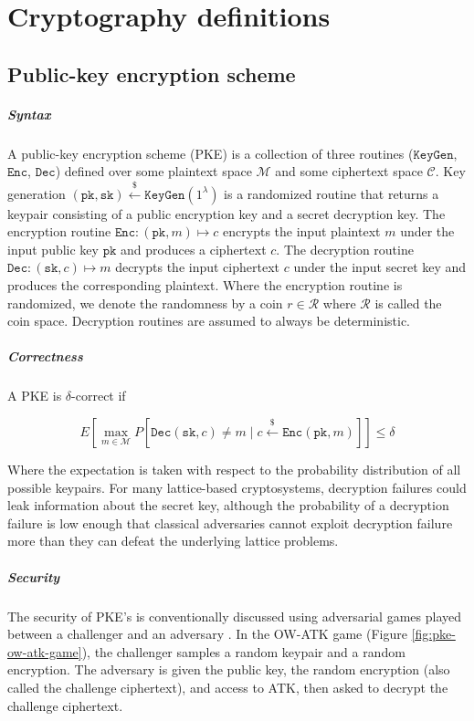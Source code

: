 \documentclass[letterpaper,12pt,titlepage,oneside,final]{book}
\newcommand{\keygen}{\texttt{KeyGen}}
\newcommand{\encrypt}{\texttt{Enc}}
\newcommand{\decrypt}{\texttt{Dec}}
\newcommand{\pk}{\texttt{pk}}
\newcommand{\sk}{\texttt{sk}}
\newcommand{\leftsample}{\stackrel{\$}{\leftarrow}}
\begin{document}
\chapter{Cryptography definitions}\label{sec:cryptography-definitions}
\section{Public-key encryption scheme}
\paragraph{Syntax} A public-key encryption scheme (PKE) is a collection of three routines ($\keygen$, $\encrypt$, $\decrypt$) defined over some plaintext space $\mathcal{M}$ and some ciphertext space $\mathcal{C}$. Key generation $(\pk, \sk) \leftsample \keygen(1^\lambda)$ is a randomized routine that returns a keypair consisting of a public encryption key and a secret decryption key. The encryption routine $\encrypt: (\pk, m) \mapsto c$ encrypts the input plaintext $m$ under the input public key $\pk$ and produces a ciphertext $c$. The decryption routine $\decrypt: (\sk, c) \mapsto m$ decrypts the input ciphertext $c$ under the input secret key and produces the corresponding plaintext. Where the encryption routine is randomized, we denote the randomness by a coin $r \in \mathcal{R}$ where $\mathcal{R}$ is called the coin space. Decryption routines are assumed to always be deterministic.

\paragraph{Correctness} A PKE is $\delta$-correct if

\begin{equation*}
    E\left[\max_{m\in\mathcal{M}}
        P\left[ \decrypt(\sk, c) \neq m \mid c \leftsample \encrypt(\pk, m)\right]
    \right] \leq \delta
\end{equation*}

Where the expectation is taken with respect to the probability distribution of all possible keypairs. For many lattice-based cryptosystems, decryption failures could leak information about the secret key, although the probability of a decryption failure is low enough that classical adversaries cannot exploit decryption failure more than they can defeat the underlying lattice problems.

\paragraph{Security} The security of PKE's is conventionally discussed using adversarial games played between a challenger and an adversary \cite{DBLP:conf/stoc/GoldwasserM82}. In the OW-ATK game (Figure \ref{fig:pke-ow-atk-game}), the challenger samples a random keypair and a random encryption. The adversary is given the public key, the random encryption (also called the challenge ciphertext), and access to ATK, then asked to decrypt the challenge ciphertext.
\end{document}
